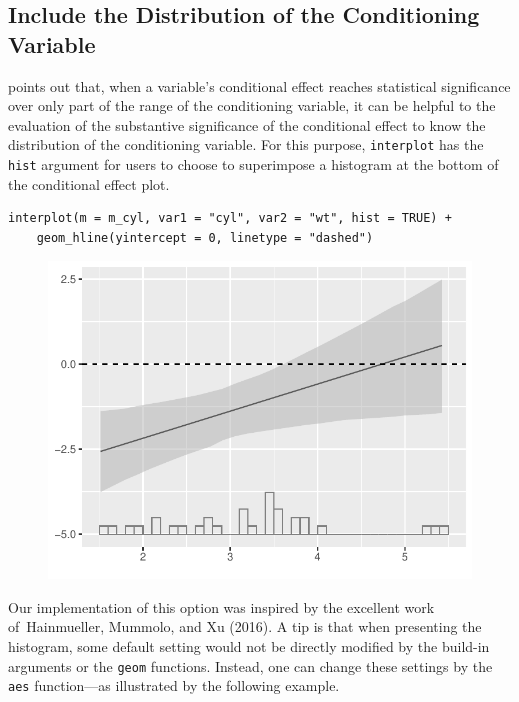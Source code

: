 \documentclass[
  article]{jss}
\begin{document}
\hypertarget{sec-include-the-distribution-of-the-conditioning-variable}{%
\subsection{Include the Distribution of the Conditioning
Variable}\label{sec-include-the-distribution-of-the-conditioning-variable}}

\citep{BerryGolderMilton2012} points out that, when a variable's
conditional effect reaches statistical significance over only part of
the range of the conditioning variable, it can be helpful to the
evaluation of the substantive significance of the conditional effect to
know the distribution of the conditioning variable. For this purpose,
\texttt{interplot} has the \texttt{hist} argument for users to choose to
superimpose a histogram at the bottom of the conditional effect plot.

\begin{verbatim}
interplot(m = m_cyl, var1 = "cyl", var2 = "wt", hist = TRUE) +
    geom_hline(yintercept = 0, linetype = "dashed")
\end{verbatim}

\begin{figure}[H]

{\centering \includegraphics{jss_manuscript_files/figure-pdf/unnamed-chunk-12-1.pdf}

}

\end{figure}

Our implementation of this option was inspired by the excellent work
of~Hainmueller, Mummolo, and Xu (2016). A tip is that when presenting
the histogram, some default setting would not be directly modified by
the build-in arguments or the \texttt{geom} functions. Instead, one can
change these settings by the \texttt{aes} function---as illustrated by
the following example.
\end{document}
